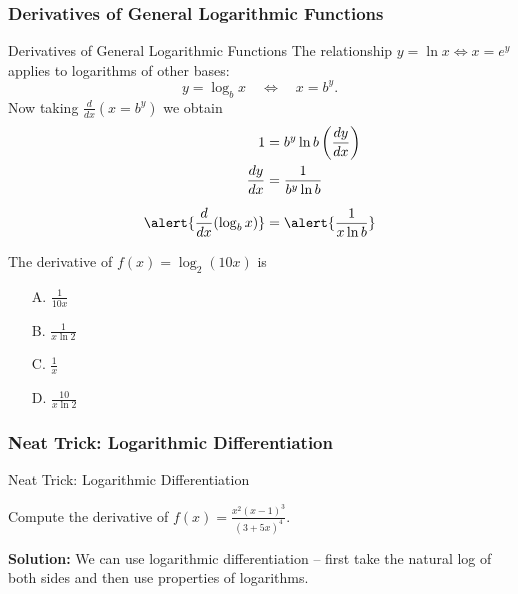 \documentclass[cal1spr16Lectures.tex]{subfiles}
\begin{document}
\subsubsection{Derivatives of General Logarithmic Functions}

\begin{frame}{\small Derivatives of General Logarithmic Functions}\footnotesize
The relationship $y=\ln x \Longleftrightarrow x=e^y$ applies to logarithms of other bases:
\[y=\log_b x \quad\Longleftrightarrow\quad x=b^y.\]
Now taking $\textstyle\frac{d}{dx}\left(x=b^y\right)$ we obtain
\vspace{-0.75pc}
\begin{align*}
1 &= b^y\ln b\left(\frac{dy}{dx}\right) \\
\frac{dy}{dx} &= \frac{1}{b^y \ln b} \\[0.5pc]
\alert{\frac{d}{dx}(\log_b x)} &=\alert{\frac{1}{x \ln b}} 
\end{align*}
\end{frame}

\begin{frame}
\begin{ex}
The derivative of $f(x)=\log_2{(10x)}$ is
\begin{itemize}
\item[A. ] $\textstyle\frac{1}{10x}$
\item[B. ] $\textstyle\frac{1}{x\ln 2}$
\item[C. ] $\textstyle\frac{1}{x}$
\item[D. ] $\textstyle\frac{10}{x\ln 2}$
\end{itemize}
\end{ex}
\end{frame}

\subsubsection{Neat Trick: Logarithmic Differentiation}

\begin{frame}{\small Neat Trick: Logarithmic Differentiation}
\begin{ex}  Compute the derivative of $f(x)=\frac{x^2(x-1)^3}{(3+5x)^4}$. \end{ex}
{\bf Solution:} We can use logarithmic differentiation -- first take the natural log of both sides and then use properties of logarithms.
\end{frame}
\end{document}
